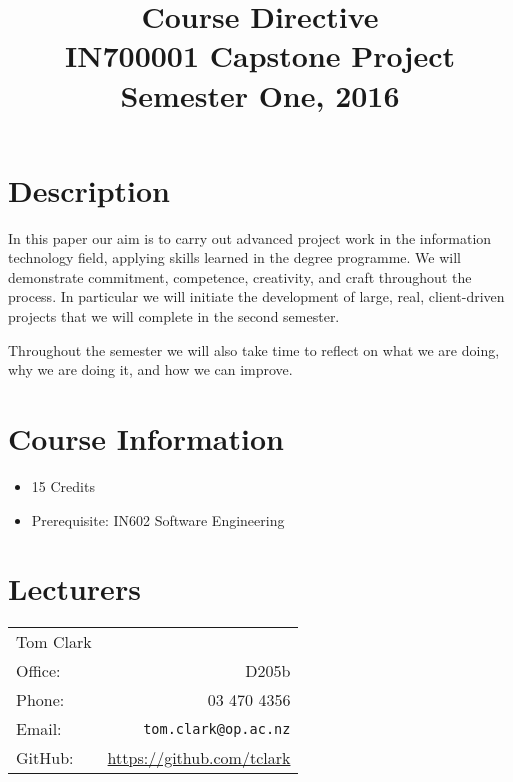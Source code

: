 \documentclass{article}
\begin{document}
\begin{figure}
\end{figure}

\title{Course Directive\\IN700001 Capstone Project \\Semester One, 2016}
\date{}
\maketitle

\section*{Description}
In this paper our aim is to carry out advanced project work in the information technology field, applying skills learned in the degree programme. We will demonstrate commitment, competence, creativity, and craft throughout the process. In particular we will initiate the development of large, real, client-driven projects that we will complete in the second semester.

Throughout the semester we will also take time to reflect on what we are doing, why we are doing it, and how we can improve.

\section*{Course Information}
\begin{itemize}
  \item 15 Credits
  \item Prerequisite: IN602 Software Engineering
\end{itemize}

\section*{Lecturers}
\begin{tabular}{lr}

  Tom Clark &    \\
     Office: & D205b \\
     Phone: & 03 470 4356 \\
     Email: & \texttt{tom.clark@op.ac.nz} \\
     GitHub: & \url{https://github.com/tclark} 
\end{tabular}
\end{document}

